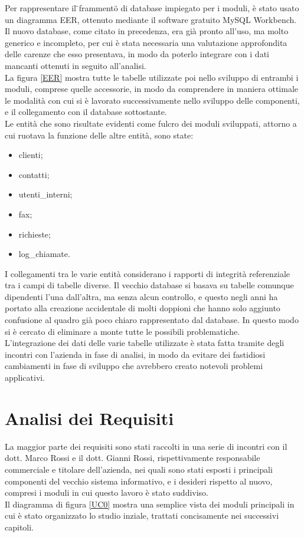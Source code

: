 \noindent
Per rappresentare il \"{}frammento\"{} di database impiegato per i moduli, \`e stato usato un diagramma EER, ottenuto mediante il software gratuito MySQL Workbench. \\
Il nuovo database, come citato in precedenza, era gi\`a pronto all'uso, ma molto generico e incompleto, per cui \`e stata necessaria una valutazione approfondita delle carenze che esso presentava, in modo da poterlo integrare con i dati mancanti ottenuti in seguito all'analisi. \\
La figura \ref{EER} mostra tutte le tabelle utilizzate poi nello sviluppo di entrambi i moduli, comprese quelle accessorie, in modo da comprendere in maniera ottimale le modalit\`a con cui si \`e lavorato successivamente nello sviluppo delle componenti, e il collegamento con il database sottostante. \\
Le entit\`a che sono risultate evidenti come fulcro dei moduli sviluppati, attorno a cui ruotava la funzione delle altre entit\`a, sono state:
\begin{itemize}
  \item clienti;
  \item contatti;
  \item utenti\_interni;
  \item fax;
  \item richieste;
  \item log\_chiamate.
\end{itemize}
\noindent
I collegamenti tra le varie entit\`a considerano i rapporti di integrit\`a referenziale tra i campi di tabelle diverse. Il vecchio database si basava su tabelle comunque dipendenti l'una dall'altra, ma senza alcun controllo, e questo negli anni ha portato alla creazione accidentale di molti doppioni che hanno solo aggiunto confusione al quadro gi\`a poco chiaro rappresentato dal database. In questo modo si \`e cercato di eliminare a monte tutte le possibili problematiche. \\
L'integrazione dei dati delle varie tabelle utilizzate \`e stata fatta tramite degli incontri con l'azienda in fase di analisi, in modo da evitare dei fastidiosi cambiamenti in fase di sviluppo che avrebbero creato notevoli problemi applicativi.

\newpage
\section{Analisi dei Requisiti}
La maggior parte dei requisiti sono stati raccolti in una serie di incontri con il dott. Marco Rossi e il dott. Gianni Rossi, rispettivamente responsabile commerciale e titolare dell'azienda, nei quali sono stati esposti i principali componenti del vecchio sistema informativo, e i desideri rispetto al nuovo, compresi i moduli in cui questo lavoro \`e stato suddiviso. \\
Il diagramma di figura \ref{UC0} mostra una semplice vista dei moduli principali in cui \`e stato organizzato lo studio inziale, trattati concisamente nei successivi capitoli.

